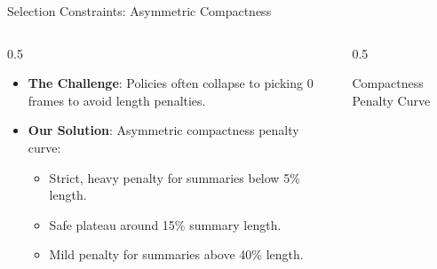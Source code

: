 \documentclass[aspectratio=169]{beamer}
\begin{document}
\begin{frame}{Selection Constraints: Asymmetric Compactness}
    \begin{columns}
        \begin{column}{0.5\textwidth}
            \begin{itemize}
                \item \textbf{The Challenge}: Policies often collapse to picking $0$ frames to avoid length penalties.
                \item \textbf{Our Solution}: Asymmetric compactness penalty curve:
                \begin{itemize}
                    \item Strict, heavy penalty for summaries below 5\% length.
                    \item Safe plateau around 15\% summary length.
                    \item Mild penalty for summaries above 40\% length.
                \end{itemize}
            \end{itemize}
        \end{column}
        \begin{column}{0.5\textwidth}
            \begin{block}{Compactness Penalty Curve}
                \centering
            \end{block}
        \end{column}
    \end{columns}
\end{frame}
\end{document}
